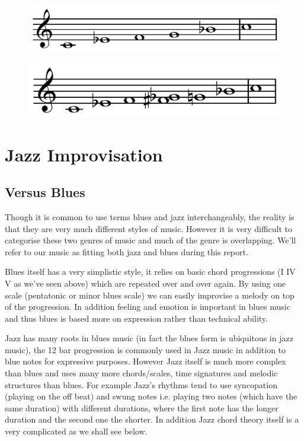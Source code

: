 \documentclass[pdftex,12pt,a4paper]{report}
\begin{document}
\begin{figure}[here]
  \centering
  \includegraphics[scale=0.25]{figure/minorpentatonicscale.png}
  \label{fig:cminorpentatonicscale}
\end{figure}

\begin{figure}[here]
  \centering
  \includegraphics[scale=0.25]{figure/bluesminorhexatonicscale.png}
  \label{fig:cminorbluesscale}
\end{figure}

\section{Jazz Improvisation}

\subsection{Versus Blues}
Though it is common to use terms blues and jazz interchangeably, the reality is that they are very much different styles of music. However it is very difficult to categorise these two genres of music and much of the genre is overlapping. We'll refer to our music as fitting both jazz and blues during this report.

Blues itself has a very simplistic style, it relies on basic chord progressions (I IV V as we've seen above) which are repeated over and over again. By using one scale (pentatonic or minor blues scale) we can easily improvise a melody on top of the progression. In addition feeling and emotion is important in blues music and thus blues is based more on expression rather than technical ability. 

Jazz has many roots in blues music (in fact the blues form is ubiquitous in jazz music), the 12 bar progression is commonly used in Jazz music in addition to blue notes for expressive purposes. However Jazz itself is much more complex than blues and uses many more chords/scales, time signatures and melodic structures than blues. For example Jazz's rhythms tend to use syncopation (playing on the off beat) and swung notes i.e. playing two notes (which have the same duration) with different durations, where the first note has the longer duration and the second one the shorter. In addition Jazz chord theory itself is a very complicated as we shall see below.
\end{document}

